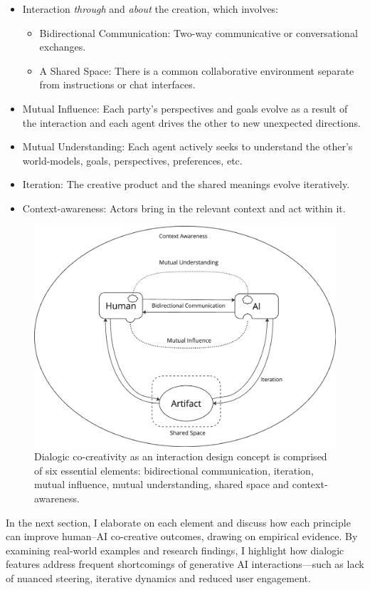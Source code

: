     \begin{itemize}
        \item Interaction \textit{through} and \textit{about} the creation, which involves: 
        \begin{itemize}
            \item Bidirectional Communication: Two-way communicative or conversational exchanges.
            \item A Shared Space: There is a common collaborative environment separate from instructions or chat interfaces.
        \end{itemize}
        \item Mutual Influence: Each party's perspectives and goals evolve as a result of the interaction and each agent drives the other to new unexpected directions.
        \item Mutual Understanding: Each agent actively seeks to understand the other's world-models, goals, perspectives, preferences, etc.
        \item Iteration: The creative product and the shared meanings evolve iteratively.
        \item Context-awareness: Actors bring in the relevant context and act within it.
    \end{itemize}


    \begin{figure}
    \centering
    \includegraphics[width=0.75\linewidth]{dialogicelements.png}
    \caption{Dialogic co-creativity as an interaction design concept is comprised of six
essential elements: bidirectional communication, iteration, mutual influence, mutual understanding, shared space and context-awareness. }
    \label{fig:enter-label}
\end{figure}


In the next section, I elaborate on each element and discuss how each principle can improve human–AI co-creative outcomes, drawing on empirical evidence. By examining real-world examples and research findings, I highlight how dialogic features address frequent shortcomings of generative AI interactions—such as lack of nuanced steering, iterative dynamics and reduced user engagement.

